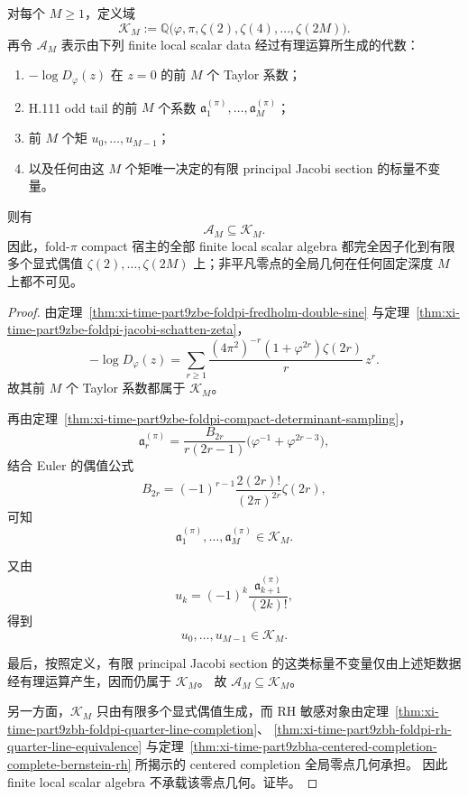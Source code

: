 \begin{theorem}\label{thm:xi-time-part9zbha-finite-local-algebra-even-zeta-factorization}
对每个 \(M\ge 1\)，定义域
\[
\mathcal K_M
:=
\mathbb Q\bigl(\varphi,\pi,\zeta(2),\zeta(4),\dots,\zeta(2M)\bigr).
\]
再令 \(\mathcal A_M\) 表示由下列 finite local scalar data 经过有理运算所生成的代数：
\begin{enumerate}
  \item \(-\log D_\varphi(z)\) 在 \(z=0\) 的前 \(M\) 个 Taylor 系数；
  \item H.111 odd tail 的前 \(M\) 个系数 \(\mathfrak a_1^{(\pi)},\dots,\mathfrak a_M^{(\pi)}\)；
  \item 前 \(M\) 个矩 \(u_0,\dots,u_{M-1}\)；
  \item 以及任何由这 \(M\) 个矩唯一决定的有限 principal Jacobi section 的标量不变量。
\end{enumerate}
则有
\[
\mathcal A_M\subseteq \mathcal K_M.
\]
因此，fold-\(\pi\) compact 宿主的全部 finite local scalar algebra 都完全因子化到有限多个显式偶值 \(\zeta(2),\dots,\zeta(2M)\) 上；非平凡零点的全局几何在任何固定深度 \(M\) 上都不可见。
\end{theorem}
\begin{proof}
由定理~\ref{thm:xi-time-part9zbe-foldpi-fredholm-double-sine} 与定理~\ref{thm:xi-time-part9zbe-foldpi-jacobi-schatten-zeta}，
\[
-\log D_\varphi(z)
=
\sum_{r\ge 1}\frac{(4\pi^2)^{-r}(1+\varphi^{2r})\zeta(2r)}{r}\,z^r.
\]
故其前 \(M\) 个 Taylor 系数都属于 \(\mathcal K_M\)。

再由定理~\ref{thm:xi-time-part9zbe-foldpi-compact-determinant-sampling}，
\[
\mathfrak a_r^{(\pi)}
=
\frac{B_{2r}}{r(2r-1)}\bigl(\varphi^{-1}+\varphi^{2r-3}\bigr),
\]
结合 Euler 的偶值公式
\[
B_{2r}
=
(-1)^{r-1}\frac{2(2r)!}{(2\pi)^{2r}}\zeta(2r),
\]
可知
\[
\mathfrak a_1^{(\pi)},\dots,\mathfrak a_M^{(\pi)}\in \mathcal K_M.
\]

又由
\[
u_k=(-1)^k\frac{\mathfrak a_{k+1}^{(\pi)}}{(2k)!},
\]
得到
\[
u_0,\dots,u_{M-1}\in \mathcal K_M.
\]

最后，按照定义，有限 principal Jacobi section 的这类标量不变量仅由上述矩数据经有理运算产生，因而仍属于 \(\mathcal K_M\)。
故 \(\mathcal A_M\subseteq \mathcal K_M\)。

另一方面，\(\mathcal K_M\) 只由有限多个显式偶值生成，而 RH 敏感对象由定理~\ref{thm:xi-time-part9zbh-foldpi-quarter-line-completion}、
\ref{thm:xi-time-part9zbh-foldpi-rh-quarter-line-equivalence}
与定理~\ref{thm:xi-time-part9zbha-centered-completion-complete-bernstein-rh} 所揭示的 centered completion 全局零点几何承担。
因此 finite local scalar algebra 不承载该零点几何。证毕。
\end{proof}


